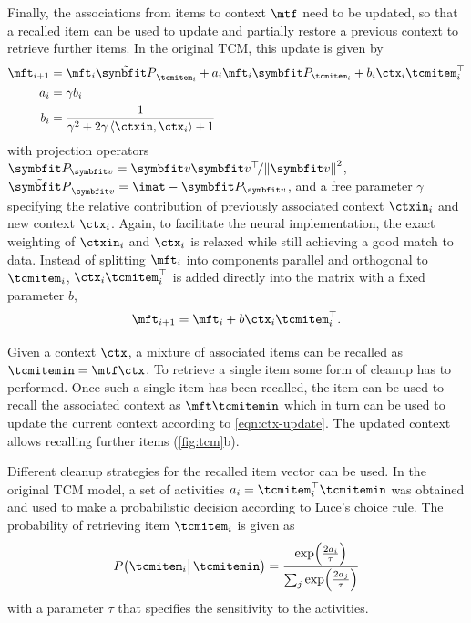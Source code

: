 Finally, the associations from items to context $\mtf$ need to be updated, so that a recalled item can be used to update and partially restore a previous context to retrieve further items.
In the original TCM, this update is given by
\begin{align}
    \mft_{i+1} &= \mft_i \tilde{\mat{P}}_{\tcmitem_i} + a_i \mft_i \mat{P}_{\tcmitem_i} + b_i \ctx_i \tcmitem_i\Tr \\
    a_i &= \gamma b_i \\
    b_i &= \frac{1}{\gamma^2 + 2 \gamma \left\langle\ctxin, \ctx_i\right\rangle + 1}
\end{align}
with projection operators $\mat{P}_{\vc v} = \vc v \vc v\Tr\!/ \norm{\vc v}^2$, $\tilde{\mat{P}}_{\vc v} = \imat - \mat{P}_{\vc v}$, and a free parameter $\gamma$ specifying the relative contribution of previously associated context $\ctxin_i$ and new context $\ctx_i$.
Again, to facilitate the neural implementation, the exact weighting of $\ctxin_i$ and $\ctx_i$ is relaxed while still achieving a good match to data.
Instead of splitting $\mft_i$ into components parallel and orthogonal to $\tcmitem_i$, $\ctx_i\tcmitem_i\Tr$ is added directly into the matrix with a fixed parameter $b$,
\begin{equation}
    \mft_{i+1} = \mft_i + b \ctx_i\tcmitem_i\Tr\text{.}
\end{equation}

Given a context $\ctx$, a mixture of associated items can be recalled as $\tcmitemin = \mtf \ctx$.
To retrieve a single item some form of cleanup has to performed.
Once such a single item has been recalled, the item can be used to recall the associated context as $\mft \tcmitemin$ which in turn can be used to update the current context according to \cref{eqn:ctx-update}.
The updated context allows recalling further items (\cref{fig:tcm}b).

Different cleanup strategies for the recalled item vector can be used.
In the original TCM model, a set of activities $a_i = \tcmitem_i\Tr \tcmitemin$ was obtained and used to make a probabilistic decision according to Luce's choice rule.
The probability of retrieving item $\tcmitem_i$ is given as
\begin{equation}
    P\bigl(\tcmitem_i \bigl|\,\tcmitemin\bigr) = \frac{\exp\!\del{\frac{2a_i}{\tau}}}{\sum_j \exp\!\del{\frac{2a_j}{\tau}}}
\end{equation}
with a parameter $\tau$ that specifies the sensitivity to the activities.

